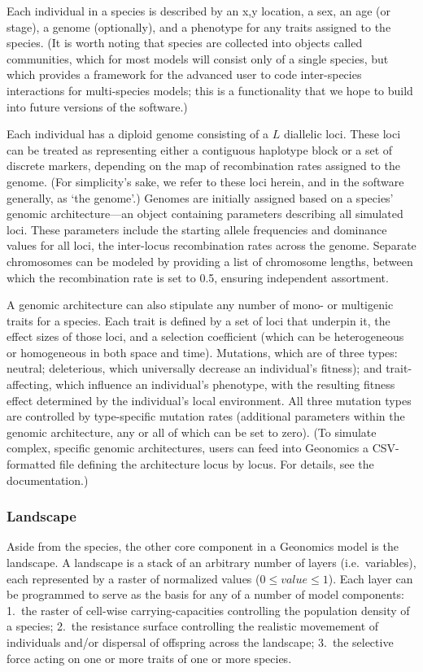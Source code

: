 ﻿\documentclass{article}
\begin{document}
Each individual in a species is described by an x,y location, a sex, an age (or stage),
a genome (optionally), and a phenotype for any traits assigned to the species.
(It is worth noting that species are collected into objects called communities,
which for most models will consist only of a single species,
but which provides a framework for the advanced user 
to code inter-species interactions for multi-species models;
this is a functionality that we hope to build into future versions of the software.)

Each individual has a diploid genome consisting of a $L$ diallelic loci.
These loci can be treated as representing either a contiguous haplotype block
or a set of discrete markers, depending on the map of recombination rates assigned to the genome.
(For simplicity's sake, we refer to these loci herein, and in the software generally, as `the genome'.)
Genomes are initially assigned based on a species' genomic architecture---an object containing
parameters describing all simulated loci.
These parameters include the starting allele frequencies and dominance values for all loci,
the inter-locus recombination rates across the genome.
Separate chromosomes can be modeled by providing a list of chromosome lengths,
between which the recombination rate is set to 0.5, ensuring independent assortment.

A genomic architecture can also stipulate any number of mono- or multigenic traits for a species.
Each trait is defined by a set of loci that underpin it, the effect sizes of those loci,
and a selection coefficient (which can be heterogeneous or homogeneous in both space and time).
Mutations, which are of three types: neutral; deleterious, which universally decrease an individual's fitness); 
and trait-affecting, which influence an individual's phenotype, with the resulting fitness effect
determined by the individual's local environment.
All three mutation types are controlled by type-specific mutation rates 
(additional parameters within the genomic architecture, any or all of which can be set to zero).
(To simulate complex, specific genomic architectures, users can feed into Geonomics a
CSV-formatted file defining the architecture locus by locus. For details, see the documentation.)

\subsubsection{Landscape}
Aside from the species, the other core component in a Geonomics model is the landscape.
A landscape is a stack of an arbitrary number of layers (i.e.\ variables),
each represented by a raster of normalized values ($0 \leq value \leq 1$).
Each layer can be programmed to serve as the basis for any of a number of model components:
1.\ the raster of cell-wise carrying-capacities controlling the population density of a species;
2.\ the resistance surface controlling the realistic movemement of individuals and/or 
dispersal of offspring across the landscape;
3.\ the selective force acting on one or more traits  of one or more species.
\end{document}
